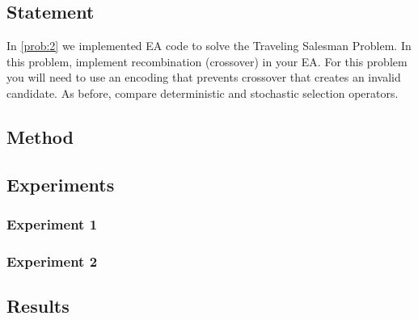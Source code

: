 \documentclass{article}
\begin{document}
\section{}\label{prob:3}
\subsection{Statement}
In \autoref{prob:2} we implemented EA code to solve the Traveling Salesman Problem. In this
problem, implement recombination (crossover) in your EA. For this problem you will need to use an
encoding that prevents crossover that creates an invalid candidate. As before, compare
deterministic and stochastic selection operators.

\subsection{Method}

\subsection{Experiments}

\subsubsection{Experiment 1}
\subsubsection{Experiment 2}

\subsection{Results}
\end{document}
